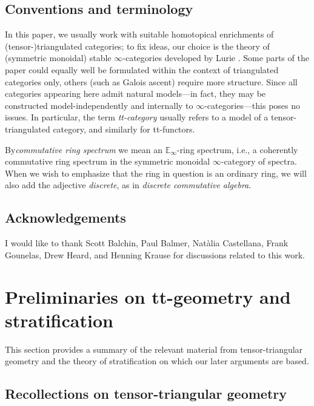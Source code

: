 \documentclass{amsart}%
\numberwithin{equation}{section}%
\theoremstyle{remark}
\begin{document}
\subsection{Conventions and terminology}

In this paper, we usually work with suitable homotopical enrichments of (tensor-)triangulated categories; to fix ideas, our choice is the theory of (symmetric monoidal) stable $\infty$-categories developed by Lurie \cite{HTTLurie,HALurie}. Some parts of the paper could equally well be formulated within the context of triangulated categories only, others (such as Galois ascent) require more structure. Since all categories appearing here admit natural models---in fact, they may be constructed model-independently and internally to $\infty$-categories---this poses no issues. %
In particular, the term \emph{tt-category} usually refers to a model of a tensor-triangulated category, and similarly for tt-functors.

By\emph{commutative ring spectrum} we mean an $\mathbb{E}_{\infty}$-ring spectrum, i.e., a coherently commutative ring spectrum in the symmetric monoidal $\infty$-category of spectra. When we wish to emphasize that the ring in question is an ordinary ring, we will also add the adjective \emph{discrete}, as in \emph{discrete commutative algebra}. 

\subsection*{Acknowledgements}

I would like to thank Scott Balchin, Paul Balmer, Nat\`alia Castellana, Frank Gounelas, Drew Heard, and Henning Krause for discussions related to this work. %



\section{Preliminaries on tt-geometry and stratification}\label{sec:ttgeometry}

This section provides a summary of the relevant material from tensor-triangular geometry and the theory of stratification on which our later arguments are based. 

\subsection{Recollections on tensor-triangular geometry}
\end{document}
